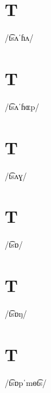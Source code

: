 \documentclass[10pt,a4paper,twoside]{book}
\begin{document}
\section*{T}

\begin{multicols}{3}
 {/t͡sʌˈɦʌ/} {}
\end{multicols}

\section*{T}

\begin{multicols}{3}
 {/t͡sʌˈɦɶp/} {}
\end{multicols}

\section*{T}

\begin{multicols}{3}
 {/t͡sʌɣ/} {}
\end{multicols}

\section*{T}

\begin{multicols}{3}
 {/t͡sɒ/} {}
\end{multicols}

\section*{T}

\begin{multicols}{3}
 {/t͡sɒŋ/} {}
\end{multicols}

\section*{T}

\begin{multicols}{3}
 {/t͡sɒpˈmɵt͡s/} {}
\end{multicols}
\end{document}
